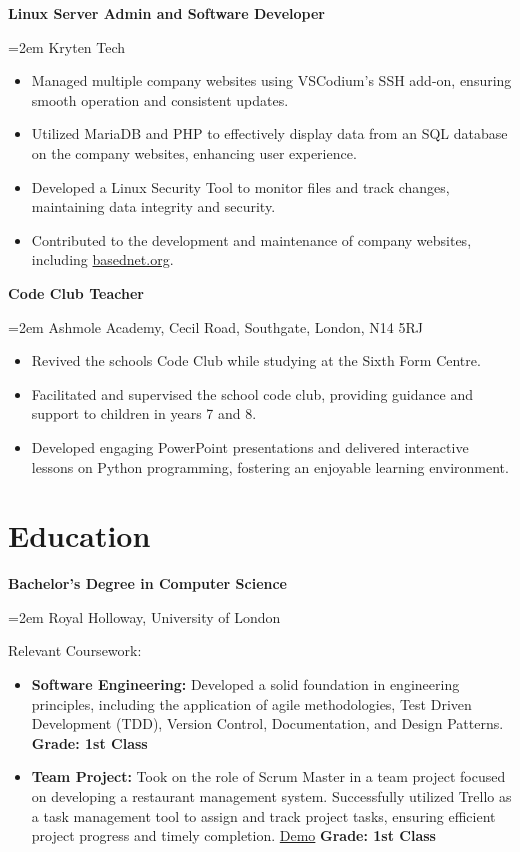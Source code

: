 \documentclass[11pt]{article} %
\newcommand{\sepspace}{\vspace*{1em}}
\newcommand{\education}[4]{
	
	
	\noindent  \textbf{#1}   
	
	
	\hfill      
	
	\framebox{%
		
		\parbox{6em}{%
			
			\centering\textbf{#2}}} \par  
	
	
	\noindent \textit{#3} \par        %
	
	\noindent\hangindent=2em\hangafter=0 \small #4  
	
	
	\normalsize \par}
\newcommand{\work}[4]{ 
	
	
	\noindent  \textbf{#1} 
	
	
	\hfill  
	
	\framebox{%
		
		\parbox{6em}{%
			
			\centering\textbf{#2}}} \par 
	
	
	\noindent \textit{#3} \par 
	
	
	\noindent\hangindent=2em\hangafter=0 \small #4
	
	
	\normalsize \par}
\begin{document}
	\work{Linux Server Admin and Software Developer}{2020-{}-2021}
	\sepspace
	{Kryten Tech}
	\sepspace
	{
		\begin{itemize}      
			\item Managed multiple company websites using VSCodium's SSH add-on, ensuring smooth operation and consistent updates.    
			\item Utilized MariaDB and PHP to effectively display data from an SQL database on the company websites, enhancing user experience.    
			\item Developed a Linux Security Tool to monitor files and track changes, maintaining data integrity and security.	
			\item Contributed to the development and maintenance of company websites, including \href{https://github.com/Igluminati/basednet.org}{basednet.org}.
		\end{itemize}
	}
	
	\work{Code Club Teacher}{2019-{}-2020}
	\sepspace
	{Ashmole Academy, Cecil Road, Southgate, London, N14 5RJ}
	\sepspace
	{
		\begin{itemize}
			\item Revived the schools Code Club while studying at the Sixth Form Centre.
			\item Facilitated and supervised the school code club, providing guidance and support to children in years 7 and 8.
			\item Developed engaging PowerPoint presentations and delivered interactive lessons on Python programming, fostering an enjoyable learning environment.
		\end{itemize}
	}
			
	
	
	\section*{Education}
	
	\education{Bachelor's Degree in Computer Science}{2020-2024}
	\sepspace
	{Royal Holloway, University of London}
	\sepspace
	{
		Relevant Coursework:
		
		\begin{itemize}
			\item\textbf{Software Engineering:} Developed a solid foundation in engineering principles, including the application of agile methodologies, Test Driven Development (TDD), Version Control, Documentation, and Design Patterns.
			\textbf{Grade: 1st Class}
			\item\textbf{Team Project:} Took on the role of Scrum Master in a team project focused on developing a restaurant management system. Successfully utilized Trello as a task management tool to assign and track project tasks, ensuring efficient project progress and timely completion.
			\href{https://www.youtube.com/watch?v=PpJfEVGBtPg}{Demo}
			\textbf{Grade: 1st Class}
		\end{itemize}
	}
	
\end{document}
